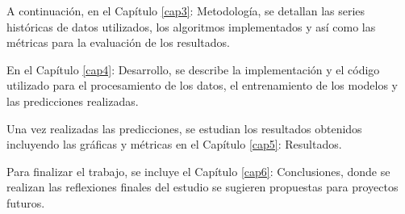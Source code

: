 A continuación, en el Capítulo \ref{cap3}: Metodología, se detallan las series históricas de datos utilizados, los algoritmos implementados y así como las métricas para la evaluación de los resultados.

En el Capítulo \ref{cap4}: Desarrollo, se describe la implementación y el código utilizado para el procesamiento de los datos, el entrenamiento de los modelos y las predicciones realizadas.

Una vez realizadas las predicciones, se estudian los resultados obtenidos incluyendo las gráficas y métricas en el Capítulo \ref{cap5}: Resultados.

Para finalizar el trabajo, se incluye el Capítulo \ref{cap6}: Conclusiones, donde se realizan las reflexiones finales del estudio se sugieren propuestas para proyectos futuros.







